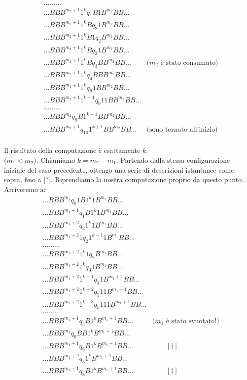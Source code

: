\begin{esempio}[Sottrazione]
\begin{eqnarray*}
&.........&\\
&...BBB^{m_{2}+1}1^{k}q_{1}B1B^{m_{2}}BB...&\\
&...BBB^{m_{2}+1}1^{k}Bq_{2}1B^{m_{2}}BB...&\\
&...BBB^{m_{2}+1}1^{k}B1q_{2}B^{m_{2}}BB...&\\
&...BBB^{m_{2}+1}1^{k}Bq_{3}1B^{m_{2}}BB...&\\
&...BBB^{m_{2}+1}1^{k}Bq_{3}BB^{m_{2}}BB...&\mbox{($m_{2}$ \`e stato consumato)}\\
&...BBB^{m_{2}+1}1^{k}q_{4}BBB^{m_{2}}BB...&\\
&...BBB^{m_{2}+1}1^{k}q_{9}1BB^{m_{2}}BB...&\\
&...BBB^{m_{2}+1}1^{k-1}q_{9}11BB^{m_{2}}BB...&\\
&.........&\\
&...BBB^{m_{2}}q_{9}B1^{k+1}BB^{m_{2}}BB...&\\
&...BBB^{m_{2}+1}q_{10}1^{k+1}BB^{m_{2}}BB...&\mbox{(sono tornato all'inizio)}\\
\end{eqnarray*}

Il risultato della computazione \`e esattamente $k$.\\

($m_{1}<m_{2}$). Chiamiamo $k=m_{2}-m_{1}$. Partendo dalla stessa
configurazione iniziale del caso precedente, ottengo una serie di
descrizioni istantanee come sopra, fino a [*]. Riprendiamo la nostra
computazione proprio da questo punto. Arriveremo a:\\
\begin{eqnarray*}
&...BBB^{m_{1}}q_{0}1B1^{k}1B^{m_{1}}BB...&\\
&...BBB^{m_{1}+1}q_{1}B1^{k}1B^{m_{1}}BB...&\\
&...BBB^{m_{1}+2}q_{2}1^{k}1B^{m_{1}}BB...&\\
&...BBB^{m_{1}+2}1q_{2}1^{k-1}1B^{m_{1}}BB...&\\
&.........&\\
&...BBB^{m_{1}+2}1^{k}1q_{2}B^{m_{1}}BB...&\\
&...BBB^{m_{1}+2}1^{k}q_{3}1B^{m_{1}}BB...&\\
&...BBB^{m_{1}+2}1^{k-1}q_{4}1B^{m_{1}+1}BB...&\\
&...BBB^{m_{1}+2}1^{k-2}q_{5}11B^{m_{1}+1}BB...&\\
&...BBB^{m_{1}+2}1^{k-3}q_{5}111B^{m_{1}+1}BB...&\\
&.........&\\
&...BBB^{m_{1}+1}q_{5}B1^{k}B^{m_{1}+1}BB...&\mbox{($m_{1}$ \`e stato svuotato!)}\\
&...BBB^{m_{1}}q_{6}BB1^{k}B^{m_{1}+1}BB...&\\
&...BBB^{m_{1}+1}q_{8}B1^{k}B^{m_{1}+1}BB...& \qquad[\dag]\\
&...BBB^{m_{1}+2}q_{8}1^{k}B^{m_{1}+1}BB...&\\
&...BBB^{m_{1}+1}q_{8}B1^{k}B^{m_{1}+1}BB...& \qquad[\dag]\\
\end{eqnarray*}


\end{esempio}
